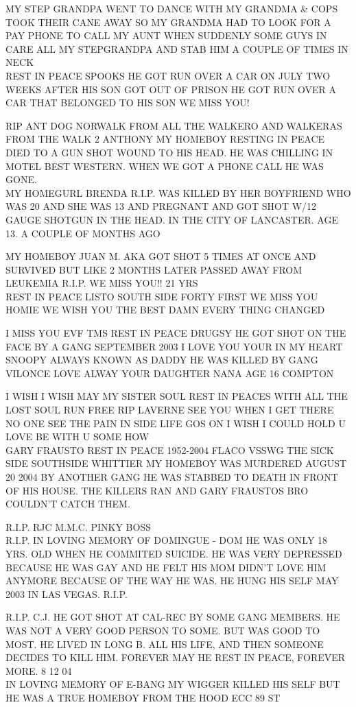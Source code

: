 \documentclass[10pt,letterpaper]{article}
\begin{document}
MY STEP GRANDPA WENT TO DANCE WITH MY GRANDMA \& COPS TOOK THEIR CANE AWAY SO MY GRANDMA HAD TO LOOK FOR A PAY PHONE TO CALL MY AUNT WHEN SUDDENLY SOME GUYS IN CARE ALL MY STEPGRANDPA AND STAB HIM A COUPLE OF TIMES IN NECK\\
REST IN PEACE SPOOKS HE GOT RUN OVER A CAR ON JULY TWO WEEKS AFTER HIS SON GOT OUT OF PRISON HE GOT RUN OVER A CAR THAT BELONGED TO HIS SON WE MISS YOU!

RIP ANT DOG NORWALK FROM ALL THE WALKERO AND WALKERAS FROM THE WALK  2 ANTHONY MY HOMEBOY RESTING IN PEACE DIED TO A GUN SHOT WOUND TO HIS HEAD.  HE WAS CHILLING IN MOTEL BEST WESTERN.  WHEN WE GOT A PHONE CALL HE WAS GONE.\\
MY HOMEGURL BRENDA R.I.P. WAS KILLED BY HER BOYFRIEND WHO WAS 20 AND SHE WAS 13 AND PREGNANT AND GOT SHOT W/12 GAUGE SHOTGUN IN THE HEAD.  IN THE CITY OF LANCASTER.  AGE 13.  A COUPLE OF MONTHS AGO

MY HOMEBOY JUAN M. AKA GOT SHOT 5 TIMES AT ONCE AND SURVIVED BUT LIKE 2 MONTHS LATER PASSED AWAY FROM LEUKEMIA R.I.P. WE MISS YOU!!  21 YRS\\
REST IN PEACE LISTO SOUTH SIDE FORTY FIRST WE MISS YOU HOMIE WE WISH YOU THE BEST DAMN EVERY THING CHANGED

I MISS YOU EVF TMS REST IN PEACE DRUGSY HE GOT SHOT ON THE FACE BY A GANG SEPTEMBER 2003 I LOVE YOU YOUR IN MY HEART\\
SNOOPY ALWAYS KNOWN AS DADDY HE WAS KILLED BY GANG VILONCE LOVE ALWAY YOUR DAUGHTER NANA AGE 16 COMPTON

I WISH I WISH MAY MY SISTER SOUL REST IN PEACES WITH ALL THE LOST SOUL RUN FREE RIP LAVERNE SEE YOU WHEN I GET THERE NO ONE SEE THE PAIN IN SIDE LIFE GOS ON I WISH I COULD HOLD U LOVE BE WITH U SOME HOW\\
GARY FRAUSTO REST IN PEACE 1952{-}2004 FLACO VSSWG THE SICK SIDE SOUTHSIDE WHITTIER MY HOMEBOY WAS MURDERED AUGUST 20 2004 BY ANOTHER GANG HE WAS STABBED TO DEATH IN FRONT OF HIS HOUSE.  THE KILLERS RAN AND GARY FRAUSTOS BRO COULDN'T CATCH THEM.

R.I.P. RJC M.M.C. PINKY BOSS\\
R.I.P. IN LOVING MEMORY OF DOMINGUE {-} DOM HE WAS ONLY 18 YRS. OLD WHEN HE COMMITED SUICIDE.  HE WAS VERY DEPRESSED BECAUSE HE WAS GAY AND HE FELT HIS MOM DIDN'T LOVE HIM ANYMORE BECAUSE OF THE WAY HE WAS.  HE HUNG HIS SELF MAY 2003 IN LAS VEGAS.  R.I.P.

R.I.P. C.J. HE GOT SHOT AT CAL{-}REC BY SOME GANG MEMBERS.  HE WAS NOT A VERY GOOD PERSON TO SOME.  BUT WAS GOOD TO MOST.  HE LIVED IN LONG B. ALL HIS LIFE, AND THEN SOMEONE DECIDES TO KILL HIM.  FOREVER MAY HE REST IN PEACE, FOREVER MORE.  8 12 04\\
IN LOVING MEMORY OF E{-}BANG MY WIGGER KILLED HIS SELF BUT HE WAS A TRUE HOMEBOY FROM THE HOOD ECC 89 ST
\end{document}
